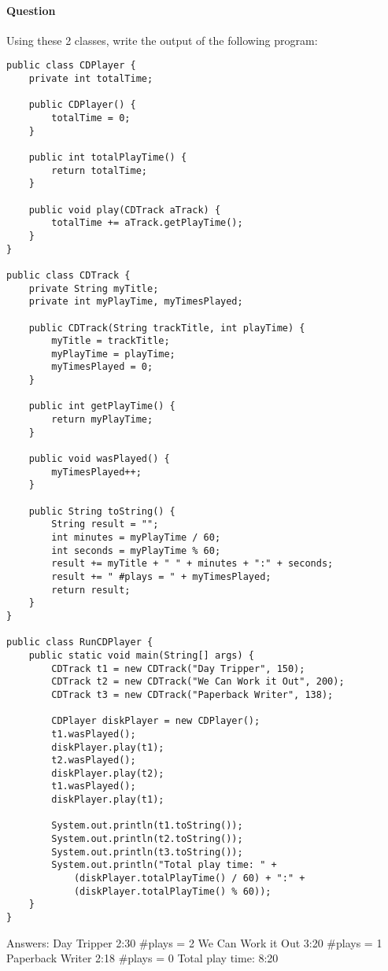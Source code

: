 \documentclass{article}
\begin{document}
\paragraph{Question }
Using these 2 classes, write the output of the following program:
\begin{lstlisting}
public class CDPlayer {
	private int totalTime;

	public CDPlayer() {
		totalTime = 0;
	}

	public int totalPlayTime() {
		return totalTime;
	}

	public void play(CDTrack aTrack) {
		totalTime += aTrack.getPlayTime();
	}
}

public class CDTrack {
	private String myTitle;
	private int myPlayTime, myTimesPlayed;

	public CDTrack(String trackTitle, int playTime) {
		myTitle = trackTitle;
		myPlayTime = playTime;
		myTimesPlayed = 0;
	}

	public int getPlayTime() {
		return myPlayTime;
	}

	public void wasPlayed() {
		myTimesPlayed++;
	}

	public String toString() {
		String result = "";
		int minutes = myPlayTime / 60;
		int seconds = myPlayTime % 60;
		result += myTitle + " " + minutes + ":" + seconds;
		result += " #plays = " + myTimesPlayed;
		return result;
	}
}

public class RunCDPlayer {
	public static void main(String[] args) {
		CDTrack t1 = new CDTrack("Day Tripper", 150);
		CDTrack t2 = new CDTrack("We Can Work it Out", 200);
		CDTrack t3 = new CDTrack("Paperback Writer", 138);

		CDPlayer diskPlayer = new CDPlayer();
		t1.wasPlayed();
		diskPlayer.play(t1);
		t2.wasPlayed();
		diskPlayer.play(t2);
		t1.wasPlayed();
		diskPlayer.play(t1);

		System.out.println(t1.toString());
		System.out.println(t2.toString());
		System.out.println(t3.toString());
		System.out.println("Total play time: " + 
			(diskPlayer.totalPlayTime() / 60) + ":" + 
			(diskPlayer.totalPlayTime() % 60));
	}
}
\end{lstlisting}
{\color{red}Answers:
\newline Day Tripper 2:30 \#plays = 2
\newline We Can Work it Out 3:20 \#plays = 1
\newline Paperback Writer 2:18 \#plays = 0
\newline Total play time: 8:20}
\end{document}
